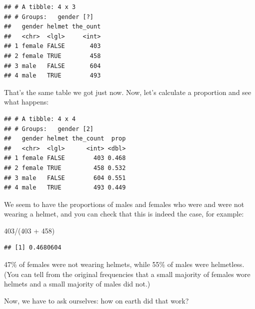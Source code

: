 \documentclass[]{tufte-book}
\newenvironment{Shaded}{}{}
\newcommand{\DataTypeTok}[1]{\textcolor[rgb]{0.56,0.13,0.00}{#1}}
\newcommand{\DecValTok}[1]{\textcolor[rgb]{0.25,0.63,0.44}{#1}}
\newcommand{\KeywordTok}[1]{\textcolor[rgb]{0.00,0.44,0.13}{\textbf{#1}}}
\newcommand{\NormalTok}[1]{#1}
\newcommand{\OperatorTok}[1]{\textcolor[rgb]{0.40,0.40,0.40}{#1}}
\newcommand{\StringTok}[1]{\textcolor[rgb]{0.25,0.44,0.63}{#1}}
\theoremstyle{definition}
\theoremstyle{definition}
\theoremstyle{definition}
\theoremstyle{remark}
\begin{document}
\begin{verbatim}
## # A tibble: 4 x 3
## # Groups:   gender [?]
##   gender helmet the_ount
##   <chr>  <lgl>     <int>
## 1 female FALSE       403
## 2 female TRUE        458
## 3 male   FALSE       604
## 4 male   TRUE        493
\end{verbatim}

That's the same table we got just now. Now, let's calculate a proportion
and see what happens:

\begin{Shaded}
\end{Shaded}

\begin{verbatim}
## # A tibble: 4 x 4
## # Groups:   gender [2]
##   gender helmet the_count  prop
##   <chr>  <lgl>      <int> <dbl>
## 1 female FALSE        403 0.468
## 2 female TRUE         458 0.532
## 3 male   FALSE        604 0.551
## 4 male   TRUE         493 0.449
\end{verbatim}

We seem to have the proportions of males and females who were and were
not wearing a helmet, and you can check that this is indeed the case,
for example:

\begin{Shaded}
\begin{Highlighting}[]
\DecValTok{403}\OperatorTok{/}\NormalTok{(}\DecValTok{403} \OperatorTok{+}\StringTok{ }\DecValTok{458}\NormalTok{)}
\end{Highlighting}
\end{Shaded}

\begin{verbatim}
## [1] 0.4680604
\end{verbatim}

47\% of females were not wearing helmets, while 55\% of males were
helmetless. (You can tell from the original frequencies that a small
majority of females wore helmets and a small majority of males did not.)

Now, we have to ask ourselves: how on earth did that work?
\end{document}

